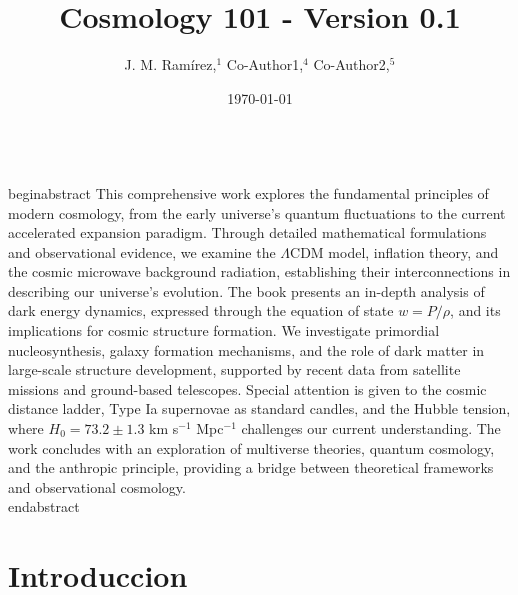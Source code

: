 \documentclass{article}\usepackage{graphicx} \usepackage{amsmath} \usepackage{colortbl}\title{Cosmology 101 - Version 0.1}
\author{J. M. Ram{\'i}rez,$^{1}$ Co-Author1,$^{4}$ Co-Author2,$^{5}$}
\date{\today}
\begin{document}
\maketitle\\begin{abstract} 
This comprehensive work explores the fundamental principles of modern cosmology, from the early universe's quantum fluctuations to the current accelerated expansion paradigm. Through detailed mathematical formulations and observational evidence, we examine the $\Lambda$CDM model, inflation theory, and the cosmic microwave background radiation, establishing their interconnections in describing our universe's evolution. The book presents an in-depth analysis of dark energy dynamics, expressed through the equation of state $w = P/\rho$, and its implications for cosmic structure formation. We investigate primordial nucleosynthesis, galaxy formation mechanisms, and the role of dark matter in large-scale structure development, supported by recent data from satellite missions and ground-based telescopes. Special attention is given to the cosmic distance ladder, Type Ia supernovae as standard candles, and the Hubble tension, where $H_0 = 73.2 \pm 1.3$ km s$^{-1}$ Mpc$^{-1}$ challenges our current understanding. The work concludes with an exploration of multiverse theories, quantum cosmology, and the anthropic principle, providing a bridge between theoretical frameworks and observational cosmology. \\end{abstract}\section{Introduccion}
\end{document}
